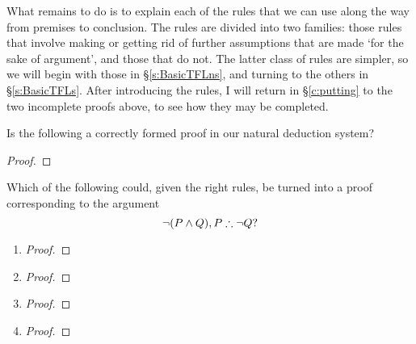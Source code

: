 What remains to do is to explain each of the rules that we can use along the way from premises to conclusion. The rules are divided into two families: those rules that involve making or getting rid of further assumptions that are made `for the sake of argument', and those that do not. The latter class of rules are simpler, so we will begin with those in §\ref{s:BasicTFLns}, and turning to the others in §\ref{s:BasicTFLs}. After introducing the rules, I will return in §\ref{c:putting} to the two incomplete proofs above, to see how they may be completed.


\practiceproblems
\problempart
Is the following a correctly formed proof in our natural deduction system?
\begin{proof}
	\open
	\open
\end{proof}

\problempart
Which of the following could, given the right rules, be turned into a proof corresponding to the argument $$\neg(P \wedge Q), P \mathrel{\therefore} \neg Q?$$
\begin{multicols}{2}\noindent
	   \begin{enumerate}
    	\item\begin{proof}
    		\open
    		\have[\ ]{}{\vdots}
    	\end{proof}
    	\item\begin{proof}
    		\open
    		\have[\ ]{}{\vdots}
    		\close
    	\end{proof}
    	\item\begin{proof}
    		\have[\ ]{}{\vdots}
    	\end{proof}
    	\item\begin{proof}
    		\open
    		\have[\ ]{}{\vdots}
    	\end{proof}
    \end{enumerate}
\end{multicols}
 

